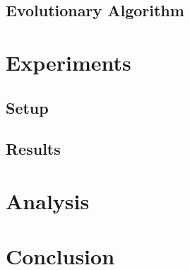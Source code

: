 \documentclass{article}
\begin{document}
\subsection{Evolutionary Algorithm}

\section{Experiments}

\subsection{Setup}

\subsection{Results}

\section{Analysis}

\section{Conclusion}
\end{document}
